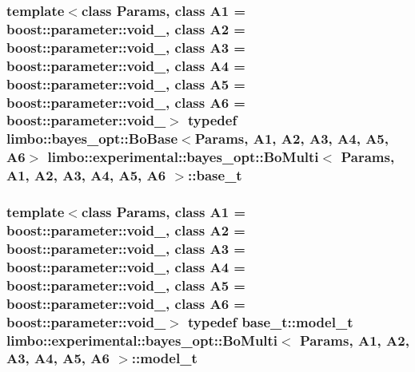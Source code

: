 \subsubsection[{base\+\_\+t}]{\setlength{\rightskip}{0pt plus 5cm}template$<$class Params, class A1 = boost\+::parameter\+::void\+\_\+, class A2 = boost\+::parameter\+::void\+\_\+, class A3 = boost\+::parameter\+::void\+\_\+, class A4 = boost\+::parameter\+::void\+\_\+, class A5 = boost\+::parameter\+::void\+\_\+, class A6 = boost\+::parameter\+::void\+\_\+$>$ typedef {\bf limbo\+::bayes\+\_\+opt\+::\+Bo\+Base}$<$Params, A1, A2, A3, A4, A5, A6$>$ {\bf limbo\+::experimental\+::bayes\+\_\+opt\+::\+Bo\+Multi}$<$ Params, A1, A2, A3, A4, A5, A6 $>$\+::{\bf base\+\_\+t}}\label{classlimbo_1_1experimental_1_1bayes__opt_1_1_bo_multi_ab5e0a9d998083ff1063045d289683287}
\hypertarget{classlimbo_1_1experimental_1_1bayes__opt_1_1_bo_multi_a94e37f45e30ac591bacf36df6767d6ad}{}
\subsubsection[{model\+\_\+t}]{\setlength{\rightskip}{0pt plus 5cm}template$<$class Params, class A1 = boost\+::parameter\+::void\+\_\+, class A2 = boost\+::parameter\+::void\+\_\+, class A3 = boost\+::parameter\+::void\+\_\+, class A4 = boost\+::parameter\+::void\+\_\+, class A5 = boost\+::parameter\+::void\+\_\+, class A6 = boost\+::parameter\+::void\+\_\+$>$ typedef {\bf base\+\_\+t\+::model\+\_\+t} {\bf limbo\+::experimental\+::bayes\+\_\+opt\+::\+Bo\+Multi}$<$ Params, A1, A2, A3, A4, A5, A6 $>$\+::{\bf model\+\_\+t}}\label{classlimbo_1_1experimental_1_1bayes__opt_1_1_bo_multi_a94e37f45e30ac591bacf36df6767d6ad}
\hypertarget{classlimbo_1_1experimental_1_1bayes__opt_1_1_bo_multi_a1a48dd47159458edc16374082379879e}{}
